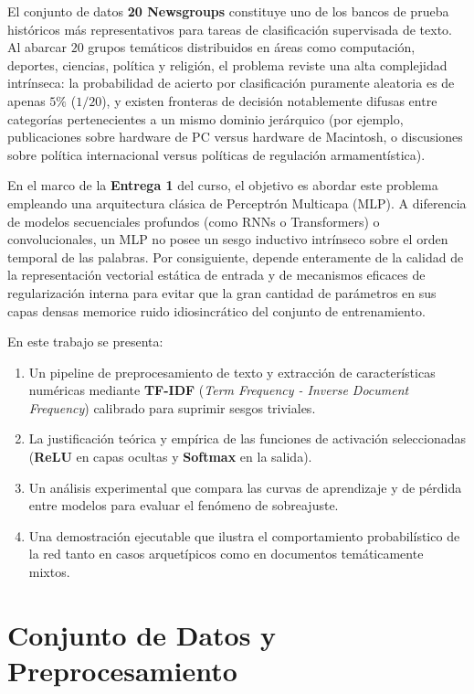 \documentclass[12pt, a4paper]{article}
\begin{document}
El conjunto de datos \textbf{20 Newsgroups} constituye uno de los bancos de prueba históricos más representativos para tareas de clasificación supervisada de texto. Al abarcar $20$ grupos temáticos distribuidos en áreas como computación, deportes, ciencias, política y religión, el problema reviste una alta complejidad intrínseca: la probabilidad de acierto por clasificación puramente aleatoria es de apenas $5\%$ ($1/20$), y existen fronteras de decisión notablemente difusas entre categorías pertenecientes a un mismo dominio jerárquico (por ejemplo, publicaciones sobre hardware de PC versus hardware de Macintosh, o discusiones sobre política internacional versus políticas de regulación armamentística).

En el marco de la \textbf{Entrega 1} del curso, el objetivo es abordar este problema empleando una arquitectura clásica de Perceptrón Multicapa (MLP). A diferencia de modelos secuenciales profundos (como RNNs o Transformers) o convolucionales, un MLP no posee un sesgo inductivo intrínseco sobre el orden temporal de las palabras. Por consiguiente, depende enteramente de la calidad de la representación vectorial estática de entrada y de mecanismos eficaces de regularización interna para evitar que la gran cantidad de parámetros en sus capas densas memorice ruido idiosincrático del conjunto de entrenamiento.

En este trabajo se presenta:
\begin{enumerate}
    \item Un pipeline de preprocesamiento de texto y extracción de características numéricas mediante \textbf{TF-IDF} (\textit{Term Frequency - Inverse Document Frequency}) calibrado para suprimir sesgos triviales.
    \item La justificación teórica y empírica de las funciones de activación seleccionadas (\textbf{ReLU} en capas ocultas y \textbf{Softmax} en la salida).
    \item Un análisis experimental que compara las curvas de aprendizaje y de pérdida entre modelos para evaluar el fenómeno de sobreajuste.
    \item Una demostración ejecutable que ilustra el comportamiento probabilístico de la red tanto en casos arquetípicos como en documentos temáticamente mixtos.
\end{enumerate}

\section{Conjunto de Datos y Preprocesamiento}
\end{document}
